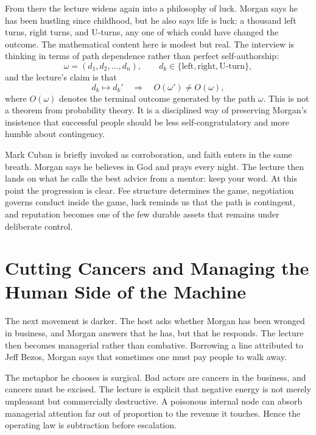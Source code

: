 From there the lecture widens again into a philosophy of luck. Morgan says he has been hustling since childhood, but he also says life is luck: a thousand left turns, right turns, and U-turns, any one of which could have changed the outcome. The mathematical content here is modest but real. The interview is thinking in terms of path dependence rather than perfect self-authorship:
\begin{equation}
\omega = (d_1,d_2,\dots,d_n), \qquad d_k \in \{\text{left},\text{right},\text{U-turn}\},
\end{equation}
and the lecture's claim is that
\begin{equation}
d_k \mapsto d_k' \quad \Longrightarrow \quad O(\omega') \neq O(\omega),
\end{equation}
where \(O(\omega)\) denotes the terminal outcome generated by the path \(\omega\). This is not a theorem from probability theory. It is a disciplined way of preserving Morgan's insistence that successful people should be less self-congratulatory and more humble about contingency.

Mark Cuban is briefly invoked as corroboration, and faith enters in the same breath. Morgan says he believes in God and prays every night. The lecture then lands on what he calls the best advice from a mentor: keep your word. At this point the progression is clear. Fee structure determines the game, negotiation governs conduct inside the game, luck reminds us that the path is contingent, and reputation becomes one of the few durable assets that remains under deliberate control.

\section{Cutting Cancers and Managing the Human Side of the Machine}

The next movement is darker. The host asks whether Morgan has been wronged in business, and Morgan answers that he has, but that he responds. The lecture then becomes managerial rather than combative. Borrowing a line attributed to Jeff Bezos, Morgan says that sometimes one must pay people to walk away.

The metaphor he chooses is surgical. Bad actors are cancers in the business, and cancers must be excised. The lecture is explicit that negative energy is not merely unpleasant but commercially destructive. A poisonous internal node can absorb managerial attention far out of proportion to the revenue it touches. Hence the operating law is subtraction before escalation.

